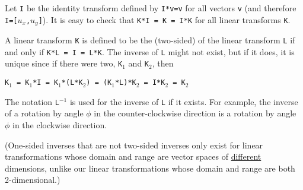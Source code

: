 \documentclass[12pt]{article}
\begin{document}
Let {\tt I} be the identity transform defined by
{\tt I*v=v} for all vectors {\tt v}  (and therefore {\tt I=[$u_x$,$u_y$]}).
It is easy to check that {\tt K*I = K = I*K} for all linear transforms
{\tt K}.

A linear transform {\tt K} is defined to be the (two-sided) 
of the linear transform {\tt L} if and only if {\tt K*L = I = L*K}.
The inverse of {\tt L} might not exist, but if it does, it is unique
since if there were two, {\tt K$_1$} and {\tt K$_2$}, then \\
\centerline{\tt K$_1$ = K$_1$*I = K$_1$*(L*K$_2$)
                      = (K$_1$*L)*K$_2$ = I*K$_2$ = K$_2$}
The notation {\tt L$^{-1}$} is used for the inverse of {\tt L} if it
exists.  For example, the inverse of a rotation by angle $\phi$ in the
counter-clockwise direction is a rotation by angle $\phi$ in the
clockwise direction.

(One-sided inverses that are not two-sided inverses only exist for
linear transformations whose domain and range are vector spaces of
\underline{different} dimensions, unlike our linear transformations
whose domain and range are both 2-dimensional.)



\newpage
\end{document}
